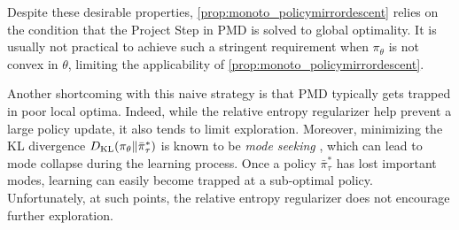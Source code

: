 Despite these desirable properties, 
\cref{prop:monoto_policymirrordescent}
relies on the condition that the Project Step in PMD is solved to
global optimality.
It is usually not practical to achieve such a stringent requirement
when $\pi_\theta$ is not convex in $\theta$,
limiting the applicability of \cref{prop:monoto_policymirrordescent}.

Another shortcoming with this naive strategy is 
that PMD typically gets trapped in poor local optima.
Indeed, while the relative entropy regularizer help prevent
a large policy update, it also tends to limit exploration.
Moreover, minimizing the KL divergence
$D_{\mathrm{KL}}(\pi_\theta \| \bar{\pi}_\tau^*)$
is known to be \emph{mode seeking} \citep{kevin2012machine},
which can lead to mode collapse during the learning process.
Once a policy $\bar{\pi}_\tau^*$ has lost important modes,
learning can easily become trapped at a sub-optimal policy.
Unfortunately, at such points,
the relative entropy regularizer does not encourage further exploration.

